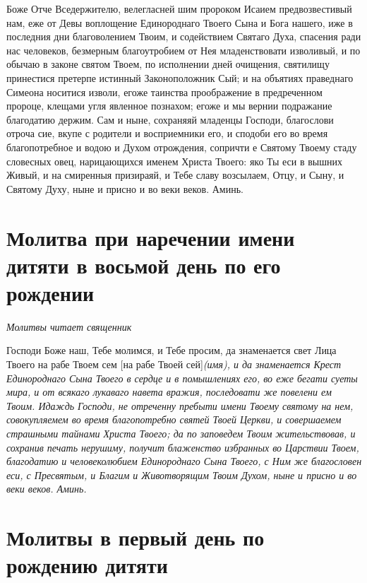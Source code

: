 Боже Отче Вседержителю, велегласней шим пророком Исаием предвозвестивый нам, еже от Девы воплощение Единороднаго Твоего Сына и Бога нашего, иже в последния дни благоволением Твоим, и содействием Святаго Духа, спасения ради нас человеков, безмерным благоутробием от Нея младенствовати изволивый, и по обычаю в законе святом  Твоем, по исполнении дней очищения, святилищу принестися претерпе истинный Законоположник Сый; и на объятиях праведнаго Симеона носитися изволи, егоже таинства проображение в предреченном пророце, клещами угля явленное познахом; егоже и мы вернии подражание благодатию держим. Сам и ныне, сохраняяй младенцы Господи, благослови отроча сие, вкупе с родители и восприемники его, и сподоби его во время благопотребное и водою и Духом отрождения, сопричти е Святому Твоему стаду словесных овец, нарицающихся именем Христа Твоего: яко Ты еси в вышних Живый, и на смиренныя призираяй, и Тебе славу возсылаем, Отцу, и Сыну, и Святому Духу, ныне и присно и во веки веков. Аминь.





\section{Молитва при наречении имени дитяти в восьмой день по его рождении}
 


\itshape Молитвы читает священник\normalfont{}

Господи Боже наш, Тебе молимся, и Тебе просим, да знаменается свет Лица Твоего на рабе Твоем сем [на рабе Твоей сей]\itshape  (имя)\normalfont{}, и да знаменается Крест Единороднаго Сына Твоего в сердце и в помышлениях его, во еже бегати суеты мира, и от всякаго лукаваго навета вражия, последовати же повелени ем Твоим. Идаждь Господи, не отреченну пребыти имени Твоему святому на нем, совокупляемем во время благопотребно святей Твоей Церкви, и совершаемем страшными тайнами Христа Твоего; да по заповедем Твоим жительствовав, и сохранив печать нерушиму, получит блаженство избранных во Царствии Твоем, благодатию и человеколюбием Единороднаго Сына Твоего, с Ним же благословен еси, с Пресвятым, и Благим и Животворящим Твоим Духом, ныне и присно и во веки веков. Аминь. 


\section{Молитвы в первый день по рождению дитяти}
 



